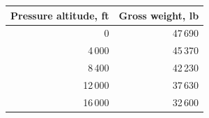 \begin{tabular}{@{}rr@{}}
\toprule
Pressure altitude, ft & Gross weight, lb \\
\midrule
0 & 47\,690 \\
4\,000 & 45\,370 \\
8\,400 & 42\,230 \\
12\,000 & 37\,630 \\
16\,000 & 32\,600 \\
\bottomrule
\end{tabular}
